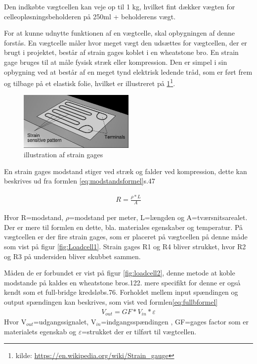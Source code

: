 Den indkøbte vægtcellen kan veje op til 1 kg, hvilket fint dækker vægten for celleopløsningsbeholderen på 250ml + beholderens vægt.

 For at kunne udnytte funktionen af en vægtcelle, skal opbygningen af denne forstås. En vægtcelle måler hvor meget vægt den udsættes for vægtcellen, der er brugt i projektet, består af strain gages koblet i en wheatstone bro. En strain gage bruges til at måle fysisk stræk eller kompression. Den er simpel i sin opbygning ved at består af en meget tynd elektrisk ledende tråd, som er ført frem og tilbage på et elastisk folie, hvilket er illustreret på \ref{fig:Strain gages}\footnote{kilde: \url{https://en.wikipedia.org/wiki/Strain_gauge}}. 
 
 \begin{figure}[H]
	\centering
	\includegraphics[width=0.5\textwidth]{billeder/Hardware/straingages1.JPG}
	\caption{illustration af strain gages}
	\label{fig:Strain gages}
\end{figure}

En strain gages modstand stiger ved stræk og falder ved kompression, dette kan beskrives ud fra formlen \ref{eq:modstandsformel}\citep{Websterbog}{s.47}

 \begin{align}
 R=\frac{\rho*L}{A}
 \label{eq:modstandsformel}
 \end{align}
 
 Hvor R=modstand, $\rho$=modstand per meter, L=længden og A=tværsnitsarealet. Der er mere til formlen en dette, bla. materiales egenskaber og temperatur. På vægtcellen er der fire strain gages, som er placeret på vægtcellen på denne måde som vist på figur \ref{fig:Loadcell1}. Strain gages R1 og R4 bliver strukket, hvor R2 og R3 på undersiden bliver skubbet sammen.
 
 Måden de er forbundet er vist på figur \ref{fig:loadcell2}, denne metode at koble modstande på kaldes en wheatstone bro\citep{ELengbog}{s.122}. mere specifikt for denne er også kendt som et full-bridge kredsløb\citep{AETbog}{s.76}. Forholdet mellem input spændingen og output spændingen kan beskrives, som vist ved formlen\ref{eq:fullbformel}
\begin{align}
 V_{out}=GF*V_{in}*\varepsilon
 \label{eq:fullbformel}
 \end{align}
 Hvor V$_{out}$=udgangssignalet, V$_{in}$=indgangsspændingen , GF=gages factor som er materialets egenskab og $\varepsilon$=strukket der er tilført til vægtcellen.

